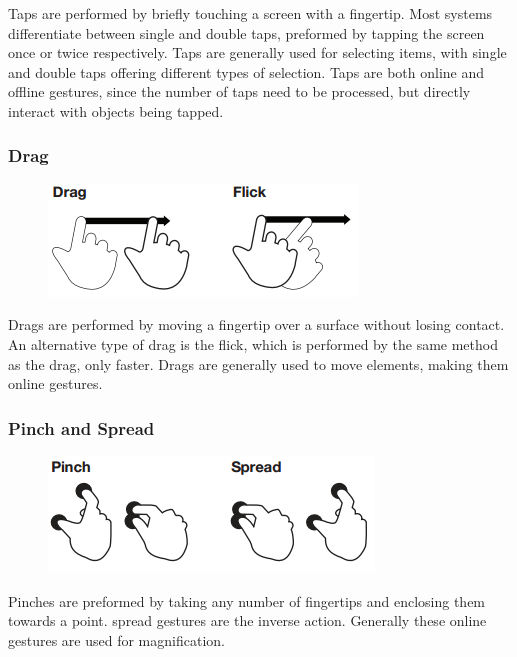 \documentclass[11pt]{report}
\begin{document}
Taps are performed by briefly touching a screen with a fingertip. 
Most systems differentiate between single and double taps, preformed by tapping the screen once or twice respectively.
Taps are generally used for selecting items, with single and double taps offering different types of selection.
Taps are both online and offline gestures, since the number of taps need to be processed, but directly interact with objects being tapped.

\subsubsection{Drag}

\begin{figure}
\includegraphics[width=\textwidth]{Drags}
\end{figure}

Drags are performed by moving a fingertip over a surface without losing contact. 
An alternative type of drag is the flick, which is performed by the same method as the drag, only faster.
Drags are generally used to move elements, making them online gestures.

\subsubsection{Pinch and Spread}

\begin{figure}
\includegraphics[width=\textwidth]{Pinch}
\end{figure}

Pinches are preformed by taking any number of fingertips and enclosing them towards a point. spread gestures are the inverse action. Generally these online gestures are used for magnification.
\end{document}
